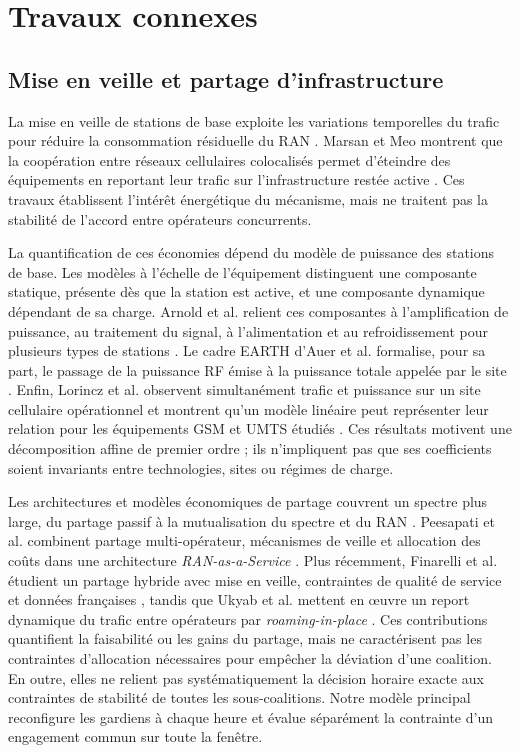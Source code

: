 \section{Travaux connexes}

\subsection{Mise en veille et partage d'infrastructure}

La mise en veille de stations de base exploite les variations temporelles du
trafic pour réduire la consommation résiduelle du RAN
\cite{oh2011}. Marsan et Meo montrent que la coopération entre réseaux
cellulaires colocalisés permet d'éteindre des équipements en reportant leur
trafic sur l'infrastructure restée active \cite{marsan2011}. Ces travaux
établissent l'intérêt énergétique du mécanisme, mais ne traitent pas la
stabilité de l'accord entre opérateurs concurrents.

La quantification de ces économies dépend du modèle de puissance des stations
de base. Les modèles à l'échelle de l'équipement distinguent une composante statique,
présente dès que la station est active, et une composante dynamique dépendant
de sa charge. Arnold et al. relient ces composantes à l'amplification de
puissance, au traitement du signal, à l'alimentation et au refroidissement
pour plusieurs types de stations \cite{arnold2010}. Le cadre EARTH d'Auer et
al. formalise, pour sa part, le passage de la puissance RF émise à la puissance
totale appelée par le site \cite{auer2011}. Enfin, Lorincz et al. observent
simultanément trafic et puissance sur un site cellulaire opérationnel et
montrent qu'un modèle linéaire peut représenter leur relation pour les
équipements GSM et UMTS étudiés \cite{lorincz2012}. Ces résultats motivent une
décomposition affine de premier ordre ; ils n'impliquent pas que ses
coefficients soient invariants entre technologies, sites ou régimes de charge.

Les architectures et modèles économiques de partage couvrent un spectre plus
large, du partage passif à la mutualisation du spectre et du RAN
\cite{cano2020}. Peesapati et al. combinent partage multi-opérateur,
mécanismes de veille et allocation des coûts dans une architecture
\emph{RAN-as-a-Service} \cite{peesapati2023}. Plus récemment, Finarelli et al.
étudient un partage hybride avec mise en veille, contraintes de qualité de
service et données françaises \cite{finarelli2025}, tandis que Ukyab et al.
mettent en œuvre un report dynamique du trafic entre opérateurs par
\emph{roaming-in-place} \cite{ukyab2025}. Ces contributions quantifient la
faisabilité ou les gains du partage, mais ne caractérisent pas les contraintes
d'allocation nécessaires pour empêcher la déviation d'une coalition. En
outre, elles ne relient pas systématiquement la décision horaire exacte aux
contraintes de stabilité de toutes les sous-coalitions. Notre modèle principal
reconfigure les gardiens à chaque heure et évalue séparément la contrainte
d'un engagement commun sur toute la fenêtre.

